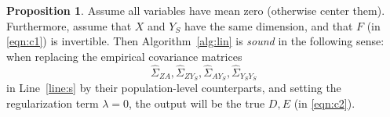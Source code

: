 \documentclass[letterpaper]{article} %
\theoremstyle{definition}%
\theoremstyle{definition}
\newtheorem{proposition}{Proposition}
\newcommand{\Obs}{Y}
\newcommand{\Out}{Z}
\begin{document}
\begin{proposition} %
	\label{thm:lin}
	Assume all variables have mean zero (otherwise center them).
	Furthermore, assume that $X$ and $Y_S$ have the same dimension, and that $F$ (in \eqref{eqn:c1}) is invertible.
	Then Algorithm~\ref{alg:lin} is \emph{sound} in the following sense: when replacing the empirical covariance matrices
	$$
	\hat{\Sigma}_{Z A}, \hat{\Sigma}_{Z Y_S}, \hat{\Sigma}_{A Y_S}, \hat{\Sigma}_{Y_S Y_S}
	$$
	 in Line~\ref{line:s} by their population-level counterparts, and setting the regularization term $\lambda=0$, the output will be the true $D, E$ (in \eqref{eqn:c2}).
\end{proposition}%
\end{document}
